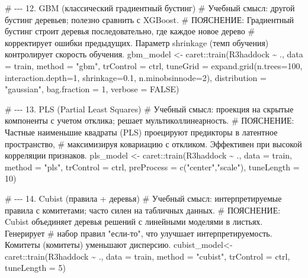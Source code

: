 \documentclass[
  letterpaper,
  DIV=11,
  numbers=noendperiod]{scrreprt}
\newenvironment{Shaded}{\begin{snugshade}}{\end{snugshade}}
\newcommand{\AttributeTok}[1]{\textcolor[rgb]{0.40,0.45,0.13}{#1}}
\newcommand{\CommentTok}[1]{\textcolor[rgb]{0.37,0.37,0.37}{#1}}
\newcommand{\ConstantTok}[1]{\textcolor[rgb]{0.56,0.35,0.01}{#1}}
\newcommand{\DecValTok}[1]{\textcolor[rgb]{0.68,0.00,0.00}{#1}}
\newcommand{\FloatTok}[1]{\textcolor[rgb]{0.68,0.00,0.00}{#1}}
\newcommand{\FunctionTok}[1]{\textcolor[rgb]{0.28,0.35,0.67}{#1}}
\newcommand{\NormalTok}[1]{\textcolor[rgb]{0.00,0.23,0.31}{#1}}
\newcommand{\OtherTok}[1]{\textcolor[rgb]{0.00,0.23,0.31}{#1}}
\newcommand{\SpecialCharTok}[1]{\textcolor[rgb]{0.37,0.37,0.37}{#1}}
\newcommand{\StringTok}[1]{\textcolor[rgb]{0.13,0.47,0.30}{#1}}
\begin{document}
\begin{Shaded}
\begin{Highlighting}[]
\CommentTok{\# {-}{-}{-} 12. GBM (классический градиентный бустинг)}
\CommentTok{\# Учебный смысл: другой бустинг деревьев; полезно сравнить с XGBoost.}
\CommentTok{\# ПОЯСНЕНИЕ: Градиентный бустинг строит деревья последовательно, где каждое новое дерево }
\CommentTok{\# корректирует ошибки предыдущих. Параметр shrinkage (темп обучения) контролирует скорость обучения.}
\NormalTok{gbm\_model   }\OtherTok{\textless{}{-}}\NormalTok{ caret}\SpecialCharTok{::}\FunctionTok{train}\NormalTok{(R3haddock }\SpecialCharTok{\textasciitilde{}}\NormalTok{ ., }\AttributeTok{data =}\NormalTok{ train, }\AttributeTok{method =} \StringTok{"gbm"}\NormalTok{,}
                            \AttributeTok{trControl =}\NormalTok{ ctrl,}
                            \AttributeTok{tuneGrid =} \FunctionTok{expand.grid}\NormalTok{(}\AttributeTok{n.trees=}\DecValTok{100}\NormalTok{, }\AttributeTok{interaction.depth=}\DecValTok{1}\NormalTok{,}
                                                   \AttributeTok{shrinkage=}\FloatTok{0.1}\NormalTok{, }\AttributeTok{n.minobsinnode=}\DecValTok{2}\NormalTok{),}
                            \AttributeTok{distribution =} \StringTok{"gaussian"}\NormalTok{, }\AttributeTok{bag.fraction =} \DecValTok{1}\NormalTok{, }\AttributeTok{verbose =} \ConstantTok{FALSE}\NormalTok{)}

\CommentTok{\# {-}{-}{-} 13. PLS (Partial Least Squares)}
\CommentTok{\# Учебный смысл: проекция на скрытые компоненты с учетом отклика; решает мультиколлинеарность.}
\CommentTok{\# ПОЯСНЕНИЕ: Частные наименьшие квадраты (PLS) проецируют предикторы в латентное пространство, }
\CommentTok{\# максимизируя ковариацию с откликом. Эффективен при высокой корреляции признаков.}
\NormalTok{pls\_model   }\OtherTok{\textless{}{-}}\NormalTok{ caret}\SpecialCharTok{::}\FunctionTok{train}\NormalTok{(R3haddock }\SpecialCharTok{\textasciitilde{}}\NormalTok{ ., }\AttributeTok{data =}\NormalTok{ train, }\AttributeTok{method =} \StringTok{"pls"}\NormalTok{,}
                            \AttributeTok{trControl =}\NormalTok{ ctrl, }\AttributeTok{preProcess =} \FunctionTok{c}\NormalTok{(}\StringTok{"center"}\NormalTok{,}\StringTok{"scale"}\NormalTok{), }\AttributeTok{tuneLength =} \DecValTok{10}\NormalTok{)}

\CommentTok{\# {-}{-}{-} 14. Cubist (правила + деревья)}
\CommentTok{\# Учебный смысл: интерпретируемые правила с комитетами; часто силен на табличных данных.}
\CommentTok{\# ПОЯСНЕНИЕ: Cubist объединяет деревья решений с линейными моделями в листьях. Генерирует }
\CommentTok{\# набор правил "если{-}то", что улучшает интерпретируемость. Комитеты (комитеты) уменьшают дисперсию.}
\NormalTok{cubist\_model}\OtherTok{\textless{}{-}}\NormalTok{ caret}\SpecialCharTok{::}\FunctionTok{train}\NormalTok{(R3haddock }\SpecialCharTok{\textasciitilde{}}\NormalTok{ ., }\AttributeTok{data =}\NormalTok{ train, }\AttributeTok{method =} \StringTok{"cubist"}\NormalTok{,}
                            \AttributeTok{trControl =}\NormalTok{ ctrl, }\AttributeTok{tuneLength =} \DecValTok{5}\NormalTok{)}


\end{Highlighting}
\end{Shaded}
\end{document}
